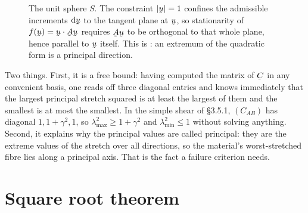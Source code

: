 \begin{figure}[htbp]\centering
{}
\caption{The unit sphere $S$. The constraint $|\bu|=1$ confines the
admissible increments $\dl\bu$ to the tangent plane at $\bu$, so
stationarity of $f(\bu)=\ip{\bu}{\bA\bu}$ requires $\bA\bu$ to be
orthogonal to that whole plane, hence parallel to $\bu$ itself. This is
: an extremum of the quadratic form is a principal direction.}
\label{fig:31}
\end{figure}

\begin{remark}\label{rem:extuse}
Two things. First, it is a free bound: having computed the matrix of $\bC$
in any convenient basis, one reads off three diagonal entries and knows
immediately that the largest principal stretch squared is at least the
largest of them and the smallest is at most the smallest. In the simple
shear of \S3.5.1, $(C_{AB})$ has diagonal $1,1+\gamma^{2},1$, so
$\lambda_{\max}^{2}\ge1+\gamma^{2}$ and $\lambda_{\min}^{2}\le1$ without
solving anything. Second, it explains why the principal values are called
principal: they are the extreme values of the stretch over all directions,
so the material's worst-stretched fibre lies along a principal axis. That
is the fact a failure criterion needs.
\end{remark}

\section{Square root theorem}\label{sec:sqrt}

